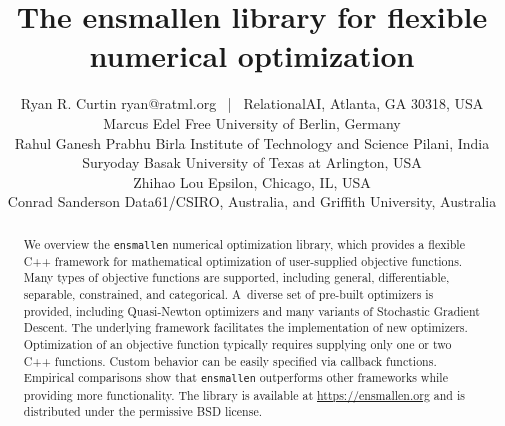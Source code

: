 \documentclass[twoside,11pt]{article}
\begin{document}
\title{The ensmallen library for flexible numerical optimization }

\author{%
  \name Ryan R. Curtin \hfill \email ryan@ratml.org ~|~ \addr RelationalAI, Atlanta, GA 30318, USA\\
  \name Marcus Edel \hfill \addr Free University of Berlin, Germany\\
  \name Rahul Ganesh Prabhu \hfill \addr Birla Institute of Technology and Science Pilani, India\\
  \name Suryoday Basak \hfill \addr University of Texas at Arlington, USA\\
  \name Zhihao Lou \hfill \addr Epsilon, Chicago, IL, USA\\
  \name Conrad Sanderson \hfill \addr Data61/CSIRO, Australia, and Griffith University, Australia%
  }



\maketitle

\begin{abstract}%
We overview the {\tt ensmallen} numerical optimization library,
which provides a flexible C++ framework
for mathematical optimization of user-supplied objective functions.
Many types of objective functions are supported,
including general, differentiable, separable, constrained, and categorical.
A~diverse set of pre-built optimizers is provided,
including Quasi-Newton optimizers and many variants of Stochastic Gradient Descent.
The underlying framework facilitates the implementation of new optimizers.
Optimization of an objective function typically requires supplying only one or two {C++} functions.
Custom behavior can be easily specified via callback functions.
Empirical comparisons show that {\tt ensmallen}
outperforms other frameworks while providing more functionality.
The library is available at \url{https://ensmallen.org}
and is distributed under the permissive BSD license.

\end{abstract}
\end{document}
